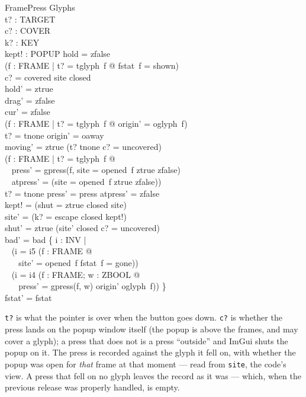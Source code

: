 \documentclass[a4paper,10pt,fleqn]{article}
\begin{document}
\begin{schema}{FramePress}
  \Delta Glyphs \\
  t? : TARGET \\
  c? : COVER \\
  k? : KEY \\
  kept! : POPUP
\where
  hold = zfalse \\
  (\forall f : FRAME | t? = tglyph~f @ fstat~f = shown) \\
  c? = covered \implies site \neq closed \\
  hold' = ztrue \\
  drag' = zfalse \\
  cur' = zfalse \\
  (\forall f : FRAME | t? = tglyph~f @ origin' = oglyph~f) \\
  t? = tnone \implies origin' = oaway \\
  moving' = ztrue \iff (t? \neq tnone \land c? = uncovered) \\
  (\forall f : FRAME | t? = tglyph~f @ \\
  \quad~ press' = gpress(f, \IF site = opened~f \THEN ztrue \ELSE zfalse) \\
  \quad~ \land atpress' = (\IF site = opened~f \THEN ztrue \ELSE zfalse)) \\
  t? = tnone \implies press' = press \land atpress' = zfalse \\
  kept! = (\IF shut = ztrue \THEN closed \ELSE site) \\
  site' = (\IF k? = escape \THEN closed \ELSE kept!) \\
  shut' = ztrue \iff (site' \neq closed \land c? = uncovered) \\
  bad' = bad \cup \{ i : INV | \\
  \quad~ (i = i5 \land (\exists f : FRAME @ \\
  \quad~ \quad~ site' = opened~f \land fstat~f = gone)) \\
  \quad~ \lor (i = i4 \land (\exists f : FRAME; w : ZBOOL @ \\
  \quad~ \quad~ press' = gpress(f, w) \land origin' \neq oglyph~f)) \} \\
  fstat' = fstat
\end{schema}

\texttt{t?} is what the pointer is over when the button goes down.  \texttt{c?}
is whether the press lands on the popup window itself (the popup is above the
frames, and may cover a glyph); a press that does not is a press ``outside''
and ImGui shuts the popup on it.  The press is recorded against the glyph it
fell on, with whether the popup was open for \emph{that} frame at that moment
--- read from \texttt{site}, the code's view.  A press that fell on no glyph
leaves the record as it was --- which, when the previous release was properly
handled, is empty.
\end{document}
